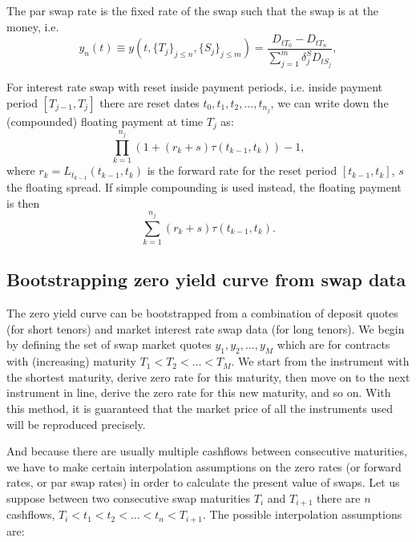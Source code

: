 The par swap rate is the fixed rate of the swap such that the swap is at the 
money, i.e.
\begin{equation} \label{E:swap}
  y_n(t) \equiv y(t,\{T_j\}_{j\le n},\{S_j\}_{j\le m}) 
    = \frac{ D_{tT_0} - D_{tT_n} }{ \sum_{j=1}^m \delta^S_j D_{tS_j} },
\end{equation}

For interest rate swap with reset inside payment periods, 
i.e. inside payment period $[T_{j-1},T_j]$ there are reset dates
$t_0,t_1,t_2,\dots,t_{n_j}$, we can write down the
(compounded) floating payment at time $T_j$ as:
\begin{equation}
  \prod_{k=1}^{n_j} ( 1 + (r_k+s)\tau(t_{k-1},t_{k}) ) - 1,
\end{equation}
where $r_k=L_{t_{k-1}}(t_{k-1},t_k)$ is the forward rate for the reset
period $[t_{k-1},t_k]$, $s$ the floating spread. 
If simple compounding is used instead, the floating payment is then
\begin{equation}
  \sum_{k=1}^{n_j} (r_k+s) \tau(t_{k-1},t_{k}).
\end{equation}


\subsection{Bootstrapping zero yield curve from swap data}

The zero yield curve can be bootstrapped from a combination of deposit quotes
(for short tenors) and market interest rate swap data (for long tenors).
We begin by defining the set of swap market quotes $y_1, y_2, \dots, y_M$ 
which are for contracts with (increasing) maturity $T_1<T_2<\dots<T_M$. 
We start from the instrument with the shortest maturity, derive zero rate for
this maturity, then move on to the next instrument in line, derive the zero rate
for this new maturity, and so on.
With this method, it is guaranteed that the market price of all the instruments
used will be reproduced precisely.

And because there are usually multiple cashflows between consecutive maturities, 
we have to make certain interpolation assumptions on the zero rates (or forward
rates, or par swap rates) in order to calculate the present value of swaps. 
Let us suppose between two consecutive swap maturities $T_i$ and $T_{i+1}$ 
there are $n$ cashflows, $T_i<t_1<t_2<\dots<t_n<T_{i+1}$. 
The possible interpolation assumptions are:

